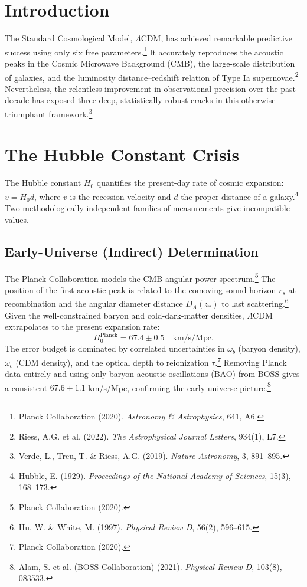 \documentclass[12pt,a4paper]{book}
\theoremstyle{definition}
\theoremstyle{remark}
\begin{document}
\section{Introduction}

The Standard Cosmological Model, $\Lambda$CDM, has achieved remarkable predictive success using only six free parameters.\footnote{Planck Collaboration (2020). \textit{Astronomy \& Astrophysics}, 641, A6.} It accurately reproduces the acoustic peaks in the Cosmic Microwave Background (CMB), the large-scale distribution of galaxies, and the luminosity distance--redshift relation of Type Ia supernovae.\footnote{Riess, A.G. et al. (2022). \textit{The Astrophysical Journal Letters}, 934(1), L7.} Nevertheless, the relentless improvement in observational precision over the past decade has exposed three deep, statistically robust cracks in this otherwise triumphant framework.\footnote{Verde, L., Treu, T. \& Riess, A.G. (2019). \textit{Nature Astronomy}, 3, 891--895.}

\section{The Hubble Constant Crisis}
\label{sec:hubble_crisis}

The Hubble constant $H_0$ quantifies the present-day rate of cosmic expansion: $v = H_0 d$, where $v$ is the recession velocity and $d$ the proper distance of a galaxy.\footnote{Hubble, E. (1929). \textit{Proceedings of the National Academy of Sciences}, 15(3), 168--173.} Two methodologically independent families of measurements give incompatible values.

\subsection{Early-Universe (Indirect) Determination}

The Planck Collaboration models the CMB angular power spectrum.\footnote{Planck Collaboration (2020).} The position of the first acoustic peak is related to the comoving sound horizon $r_s$ at recombination and the angular diameter distance $D_A(z_*)$ to last scattering.\footnote{Hu, W. \& White, M. (1997). \textit{Physical Review D}, 56(2), 596--615.} Given the well-constrained baryon and cold-dark-matter densities, $\Lambda$CDM extrapolates to the present expansion rate:
\begin{equation}
    H_0^{\mathrm{Planck}} = 67.4 \pm 0.5 \quad \text{km/s/Mpc}.
    \label{eq:H0_Planck}
\end{equation}
The error budget is dominated by correlated uncertainties in $\omega_b$ (baryon density), $\omega_c$ (CDM density), and the optical depth to reionization $\tau$.\footnote{Planck Collaboration (2020).} Removing Planck data entirely and using only baryon acoustic oscillations (BAO) from BOSS gives a consistent $67.6 \pm 1.1$ km/s/Mpc, confirming the early-universe picture.\footnote{Alam, S. et al. (BOSS Collaboration) (2021). \textit{Physical Review D}, 103(8), 083533.}
\end{document}
